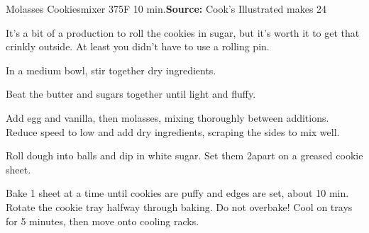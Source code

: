 \begin{recipe}{Molasses Cookies}{mixer \hfill 375\0F \hfill 10 min.}{\textbf{Source:} Cook's Illustrated \hfill makes 24}

 \freeform It's a bit of a production to roll the cookies in sugar, but it's worth it to get that crinkly outside. At least you didn't have to use a rolling pin.

 In a medium bowl, stir together dry ingredients.

 Beat the butter and sugars together until light and fluffy.

 Add egg and vanilla, then molasses, mixing thoroughly between additions. Reduce speed to low and add dry ingredients, scraping the sides to mix well.

 \newstep Roll dough into balls and dip in white sugar. Set them 2\inch apart on a greased cookie sheet.

 \newstep Bake 1 sheet at a time until cookies are puffy and edges are set, about 10 min. Rotate the cookie tray halfway through baking. Do not overbake! Cool on trays for 5 minutes, then move onto cooling racks.
\end{recipe}

